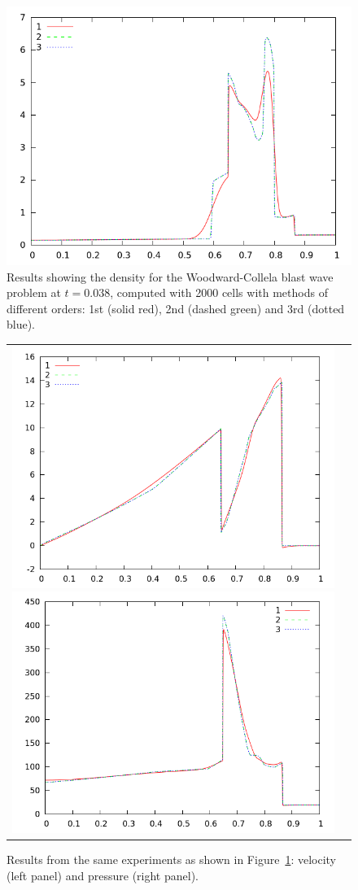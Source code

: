 \documentclass[10pt]{article}
\begin{document}
\begin{figure}[h]
  \begin{center}
     \includegraphics[width=.95\textwidth]{den_T12_2000.png}	
  \end{center}
  \caption{Results showing the density for the Woodward-Collela blast wave problem at $t=0.038$, computed with 2000 cells with methods of different orders: 1st (solid red), 2nd (dashed green) and 3rd (dotted blue).}
  \label{fig:den_T12_2000}
\end{figure}

\begin{figure}[h]
  \begin{center}
	\begin{tabular}{cc}
     \includegraphics[width=.475\textwidth]{vel_T12_2000.png}
     \includegraphics[width=.475\textwidth]{prs_T12_2000.png}	
    \end{tabular}
  \end{center}
 \caption{Results from the same experiments as shown in Figure~\ref{fig:den_T12_2000}:
  velocity (left panel) and pressure (right panel).}
\end{figure}
\end{document}
